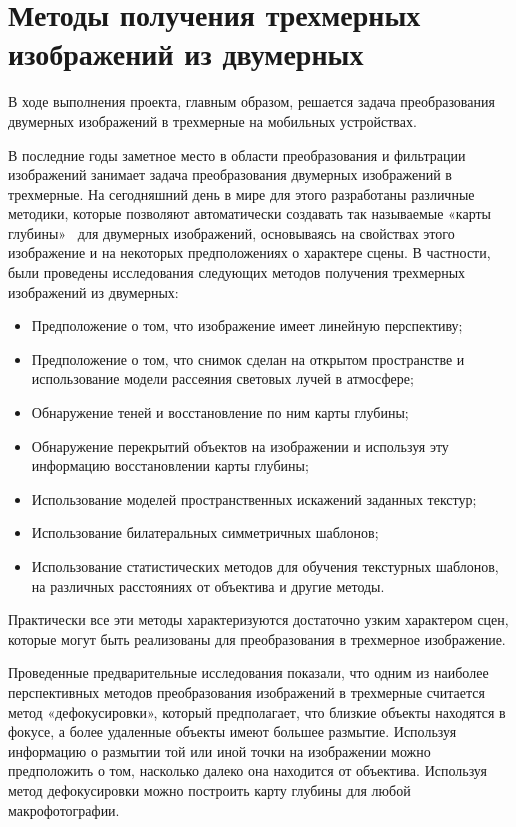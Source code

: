 
\section{Методы получения трехмерных изображений из двумерных}

В ходе выполнения проекта, главным образом, решается задача преобразования двумерных изображений в трехмерные на мобильных устройствах.

В последние годы заметное место в области преобразования и фильтрации изображений занимает задача преобразования двумерных изображений в трехмерные. На сегодняшний день в мире для этого разработаны различные методики, которые позволяют автоматически создавать так называемые «карты глубины»~\cite{depthMap3} для двумерных изображений, основываясь на свойствах этого изображение и на некоторых предположениях о характере сцены.  В частности, были проведены исследования следующих методов получения трехмерных изображений из двумерных:

\begin{itemize}
	\item Предположение о том, что изображение имеет линейную перспективу;
	\item Предположение о том, что снимок сделан на открытом пространстве и использование модели рассеяния световых лучей в атмосфере;
	\item Обнаружение теней и восстановление по ним карты глубины;
	\item Обнаружение перекрытий объектов на изображении и используя эту информацию восстановлении карты глубины;
	\item Использование моделей пространственных искажений заданных текстур;
	\item Использование билатеральных симметричных шаблонов;
	\item Использование статистических методов для обучения текстурных шаблонов, на различных расстояниях от объектива и другие методы.
\end{itemize}

Практически все эти методы характеризуются достаточно узким характером сцен, которые могут быть реализованы для преобразования в трехмерное изображение. 

Проведенные предварительные исследования показали, что одним из наиболее перспективных методов преобразования изображений в трехмерные считается метод «дефокусировки», который предполагает, что близкие объекты находятся в фокусе, а более удаленные объекты имеют большее размытие. Используя информацию о размытии той или иной точки на изображении можно предположить о том, насколько далеко она находится от объектива.  Используя метод дефокусировки можно построить карту глубины для любой макрофотографии. 

